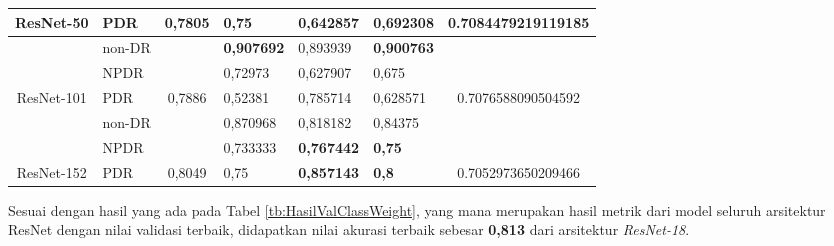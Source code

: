 \begin{table}[H]
\begin{center}
\begin{tabular}{|c|l|c|l|l|l|c|}
			\multirow{-3}{*}{ResNet-50}  & PDR                                                & \multirow{-3}{*}{0,7805} & 0,75     & 0,642857 & 0,692308 & \multirow{-3}{*}{\textbf{0.7084479219119185}} \\ \hline
			& non-DR                                             &                          & \textbf{0,907692} & 0,893939 & \textbf{0,900763} &                    \\ \cline{2-2} \cline{4-6}
			& NPDR                                               &                          & 0,72973  & 0,627907 & 0,675    &                                      \\ \cline{2-2} \cline{4-6}
			\multirow{-3}{*}{ResNet-101} & PDR                                                & \multirow{-3}{*}{0,7886} & 0,52381  & 0,785714 & 0,628571 & \multirow{-3}{*}{0.7076588090504592} \\ \hline
			& non-DR                                             &                          & 0,870968 & 0,818182 & 0,84375  &                                      \\ \cline{2-2} \cline{4-6}
			& NPDR                                               &                          & 0,733333 & \textbf{0,767442} & \textbf{0,75}     &                    \\ \cline{2-2} \cline{4-6}
			\multirow{-3}{*}{ResNet-152} & PDR                                                & \multirow{-3}{*}{0,8049} & 0,75     & \textbf{0,857143} & \textbf{0,8}      & \multirow{-3}{*}{0.7052973650209466} \\ \hline
		\end{tabular}
	\end{center}
\end{table}

Sesuai dengan hasil yang ada pada Tabel \ref{tb:HasilValClassWeight}, yang mana merupakan hasil metrik dari model seluruh arsitektur ResNet dengan nilai validasi terbaik, didapatkan nilai akurasi terbaik sebesar \textbf{0,813} dari arsitektur \emph{ResNet-18}.

